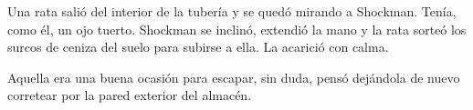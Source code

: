 Una rata salió del interior de la tubería y se quedó mirando a Shockman. Tenía, como él, un ojo tuerto. Shockman se inclinó, extendió la mano y la rata sorteó los surcos de ceniza del suelo para subirse a ella. La acarició con calma.

Aquella era una buena ocasión para escapar, sin duda, pensó dejándola de nuevo corretear por la pared exterior del almacén.

\endinput
